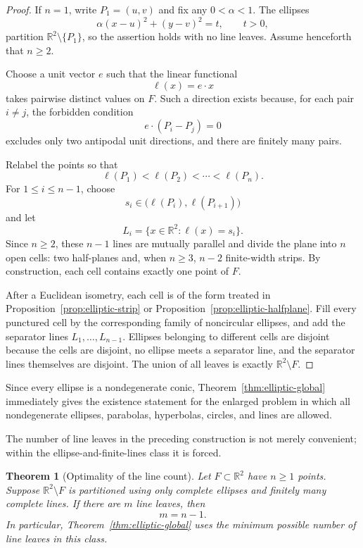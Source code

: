 \documentclass[11pt]{article}
\newtheorem{theorem}{Theorem}[section]
\newcommand{\R}{\mathbb{R}}
\begin{document}
\begin{proof}
If $n=1$, write $P_1=(u,v)$ and fix any $0<\alpha<1$. The ellipses
\[
\alpha(x-u)^2+(y-v)^2=t,\qquad t>0,
\]
partition $\R^2\setminus\{P_1\}$, so the assertion holds with no line leaves. Assume henceforth that $n\ge2$.

Choose a unit vector $e$ such that the linear functional
\[
\ell(x)=e\cdot x
\]
takes pairwise distinct values on $F$. Such a direction exists because, for each pair $i\ne j$, the forbidden condition
\[
e\cdot(P_i-P_j)=0
\]
excludes only two antipodal unit directions, and there are finitely many pairs.

Relabel the points so that
\[
\ell(P_1)<\ell(P_2)<\cdots<\ell(P_n).
\]
For $1\le i\le n-1$, choose
\[
s_i\in\bigl(\ell(P_i),\ell(P_{i+1})\bigr)
\]
and let
\[
L_i=\{x\in\R^2:\ell(x)=s_i\}.
\]
Since $n\ge2$, these $n-1$ lines are mutually parallel and divide the plane into $n$ open cells: two half-planes and, when $n\ge3$, $n-2$ finite-width strips. By construction, each cell contains exactly one point of $F$.

After a Euclidean isometry, each cell is of the form treated in Proposition~\ref{prop:elliptic-strip} or Proposition~\ref{prop:elliptic-halfplane}. Fill every punctured cell by the corresponding family of noncircular ellipses, and add the separator lines $L_1,\dots,L_{n-1}$. Ellipses belonging to different cells are disjoint because the cells are disjoint, no ellipse meets a separator line, and the separator lines themselves are disjoint. The union of all leaves is exactly $\R^2\setminus F$.
\end{proof}

Since every ellipse is a nondegenerate conic, Theorem~\ref{thm:elliptic-global} immediately gives the existence statement for the enlarged problem in which all nondegenerate ellipses, parabolas, hyperbolas, circles, and lines are allowed.

The number of line leaves in the preceding construction is not merely convenient; within the ellipse-and-finite-lines class it is forced.

\begin{theorem}[Optimality of the line count]\label{thm:elliptic-optimal}
Let $F\subset\R^2$ have $n\ge1$ points. Suppose $\R^2\setminus F$ is partitioned using only complete ellipses and finitely many complete lines. If there are $m$ line leaves, then
\[
m=n-1.
\]
In particular, Theorem~\ref{thm:elliptic-global} uses the minimum possible number of line leaves in this class.
\end{theorem}
\end{document}
